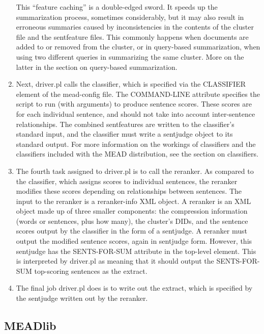 \documentclass[10pt]{article}
\begin{document}
\begin{enumerate}
This ``feature caching'' is a double-edged sword.  It speeds
up the summarization process, sometimes considerably, but it
may also result in erroneous summaries caused by inconsistencies
in the contents of the cluster file and the sentfeature files.
This commonly happens when documents are added to or removed
from the cluster, or in query-based summarization, when using
two different queries in summarizing the same cluster.  More
on the latter in the section on query-based summarization.

\item
Next, driver.pl calls the classifier,
which is specified via the CLASSIFIER element of the mead-config
file.  The COMMAND-LINE attribute specifies the script to 
run (with arguments) to produce sentence scores.  These scores
are for each individual sentence, and should not take into
account inter-sentence relationships.  The combined
sentfeatures are written to the classifier's standard input,
and the classifier must write a sentjudge object to its 
standard output.  For more information on the workings of 
classifiers and the classifiers included with the MEAD 
distribution, see the section on classifiers.

\item
The fourth task assigned to driver.pl is to call the reranker.
As compared to the classifier, which assigns scores to 
individual sentences, the reranker modifies these scores
depending on relationships between sentences.  The input to
the reranker is a reranker-info XML object.  A reranker 
is an XML object made up of three smaller components: the
compression information (words or sentences, plus how many),
the cluster's DIDs, and the sentence scores output by the
classifier in the form of a sentjudge.  A reranker 
must output the modified sentence scores, again in sentjudge
form.  However, this sentjudge has the SENTS-FOR-SUM attribute
in the top-level element.  This is interpreted by driver.pl
as meaning that it should output the SENTS-FOR-SUM top-scoring
sentences as the extract.

\item
The final job driver.pl does is to write out the extract,
which is specified by the sentjudge written out by
the reranker.

\end{enumerate}

\subsection{MEADlib}
\end{document}
